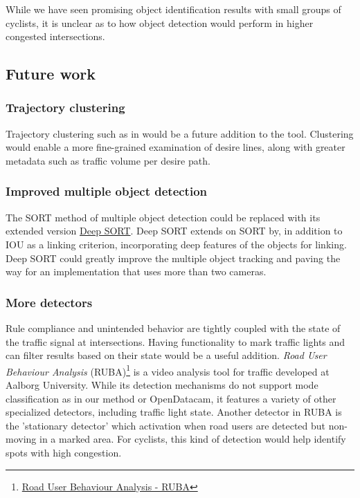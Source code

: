While we have seen promising object identification results with small groups
of cyclists, it is unclear as to how object detection would perform in higher congested intersections. 
\ \\

\subsection{Future work}
\subsubsection{Trajectory clustering}
Trajectory clustering such as in \cite{gariel_trajectory_2011} would be a future addition to the tool.
Clustering would enable a more fine-grained examination of desire lines,
along with greater metadata such as traffic volume per desire path.

\subsubsection{Improved multiple object detection}
The SORT method of multiple object detection could be replaced with its extended version \href{https://github.com/nwojke/deep_sort}{Deep SORT}.
Deep SORT extends on SORT by, in addition to IOU as a linking criterion, incorporating
deep features of the objects for linking. Deep SORT could greatly improve the multiple object tracking
and paving the way for an implementation that uses more than two cameras.

\subsubsection{More detectors}
Rule compliance and unintended behavior are tightly coupled with the state of the traffic signal at intersections. 
Having functionality to mark traffic lights and can filter results based on their state would be a useful addition. 
\textit{Road User Behaviour Analysis} (RUBA)\footnote{\href{https://vbn.aau.dk/en/publications/the-ruba-watchdog-video-analysis-tool}{Road User Behaviour Analysis - RUBA}} 
is a video analysis tool for traffic developed at Aalborg University. While its detection mechanisms do not support mode classification
as in our method or OpenDatacam, it features a variety of other specialized detectors, including traffic light state. 
Another detector in RUBA is the 'stationary detector' which activation when road users are detected but non-moving in a marked area. 
For cyclists, this kind of detection would help identify spots with high congestion.